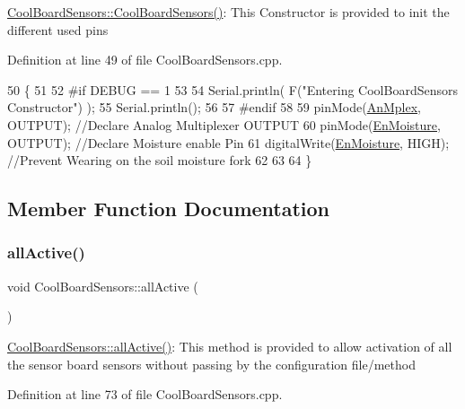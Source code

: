 \hyperlink{class_cool_board_sensors_a91ff2a02f5486f90cf2413a1cf8a9ed4}{Cool\+Board\+Sensors\+::\+Cool\+Board\+Sensors()}\+: This Constructor is provided to init the different used pins 

Definition at line 49 of file Cool\+Board\+Sensors.\+cpp.


\begin{DoxyCode}
50 \{
51 
52 \textcolor{preprocessor}{#if DEBUG == 1}
53 
54     Serial.println( F(\textcolor{stringliteral}{"Entering CoolBoardSensors Constructor"}) );
55     Serial.println();
56 
57 \textcolor{preprocessor}{#endif}
58     
59     pinMode(\hyperlink{class_cool_board_sensors_a12ef28b1046219e0aee10bf64e28c4a5}{AnMplex}, OUTPUT);                \textcolor{comment}{//Declare Analog Multiplexer OUTPUT}
60     pinMode(\hyperlink{class_cool_board_sensors_a6177d02e14a057a2f171a2e930b5038d}{EnMoisture}, OUTPUT);             \textcolor{comment}{//Declare Moisture enable Pin}
61     digitalWrite(\hyperlink{class_cool_board_sensors_a6177d02e14a057a2f171a2e930b5038d}{EnMoisture}, HIGH);            \textcolor{comment}{//Prevent Wearing on the soil moisture fork}
62 
63 
64 \}
\end{DoxyCode}


\subsection{Member Function Documentation}
\mbox{\label{class_cool_board_sensors_aa432c5aac88f89c31a10766390f23e0b}} 
\subsubsection{\texorpdfstring{all\+Active()}{allActive()}}
{\footnotesize\ttfamily void Cool\+Board\+Sensors\+::all\+Active (\begin{DoxyParamCaption}{ }\end{DoxyParamCaption})}

\hyperlink{class_cool_board_sensors_aa432c5aac88f89c31a10766390f23e0b}{Cool\+Board\+Sensors\+::all\+Active()}\+: This method is provided to allow activation of all the sensor board sensors without passing by the configuration file/method 

Definition at line 73 of file Cool\+Board\+Sensors.\+cpp.


